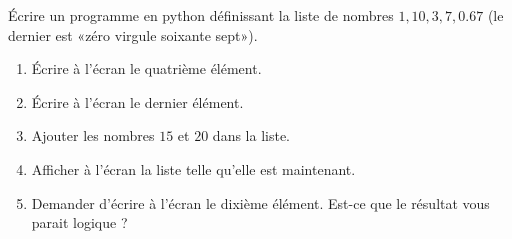 
\begin{exercice}\label{exoPremiere-0033}

    Écrire un programme en python définissant la liste de nombres \( 1,10,3,7,0.67\) (le dernier est «zéro virgule soixante sept»). 
    \begin{enumerate}
        \item
        Écrire à l'écran le quatrième élément.
    \item
        Écrire à l'écran le dernier élément. 
    \item
        Ajouter les nombres \( 15\) et \( 20\) dans la liste.
    \item
        Afficher à l'écran la liste telle qu'elle est maintenant.
    \item
        Demander d'écrire à l'écran le dixième élément. Est-ce que le résultat vous parait logique ?
    \end{enumerate}

\end{exercice}
